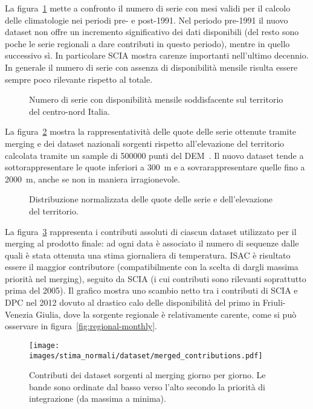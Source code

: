 La figura~\ref{fig:merged-timeseries} mette a confronto il numero di serie con mesi validi per il calcolo delle climatologie nei periodi pre- e post-1991. Nel periodo pre-1991 il nuovo dataset non offre un incremento significativo dei dati disponibili (del resto sono poche le serie regionali a dare contributi in questo periodo), mentre in quello successivo sì. In particolare SCIA mostra carenze importanti nell'ultimo decennio. In generale il numero di serie con assenza di disponibilità mensile risulta essere sempre poco rilevante rispetto al totale.
\begin{figure}[ht]
  \centering
  
  \caption{Numero di serie con disponibilità mensile soddisfacente sul territorio del centro-nord Italia.}\label{fig:merged-timeseries}
\end{figure}

La figura~\ref{fig:merged-elevations} mostra la rappresentatività delle quote delle serie ottenute tramite merging e dei dataset nazionali sorgenti rispetto all'elevazione del territorio calcolata tramite un sample di \num{500000} punti del DEM~\cite{europeanspaceagencyCopernicusGlobalEuropean2022}. Il nuovo dataset tende a sottorappresentare le quote inferiori a \qty{300}{\meter} e a sovrarappresentare quelle fino a \qty{2000}{\meter}, anche se non in maniera irragionevole.
\begin{figure}[ht]
  \centering
  
  \caption{Distribuzione normalizzata delle quote delle serie e dell'elevazione del territorio.}\label{fig:merged-elevations}
\end{figure}

La figura~\ref{fig:merged-contributions} rappresenta i contributi assoluti di ciascun dataset utilizzato per il merging al prodotto finale: ad ogni data è associato il numero di sequenze dalle quali è stata ottenuta una stima giornaliera di temperatura. ISAC è risultato essere il maggior contributore (compatibilmente con la scelta di dargli massima priorità nel merging), seguito da SCIA (i cui contributi sono rilevanti soprattutto prima del 2005). Il grafico mostra uno scambio netto tra i contributi di SCIA e DPC nel 2012 dovuto al drastico calo delle disponibilità del primo in Friuli-Venezia Giulia, dove la sorgente regionale è relativamente carente, come si può osservare in figura~\ref{fig:regional-monthly}.
\begin{figure}[ht]
  \centering
  \texttt{[image: images/stima\_normali/dataset/merged\_contributions.pdf]}
  \caption{Contributi dei dataset sorgenti al merging giorno per giorno. Le bande sono ordinate dal basso verso l'alto secondo la priorità di integrazione (da massima a minima).}\label{fig:merged-contributions}
\end{figure}

